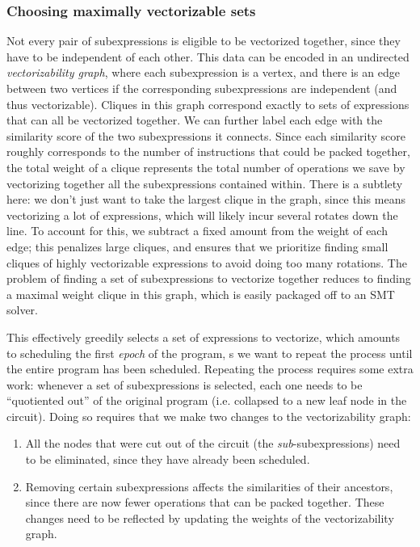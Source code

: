 \subsubsection*{Choosing maximally vectorizable sets}%
Not every pair of subexpressions is eligible to be vectorized together, since they have to be independent of each other.
This data can be encoded in an undirected {\em vectorizability graph}, where each subexpression is a vertex, and there is an edge between two vertices if the corresponding subexpressions are independent (and thus vectorizable).
Cliques in this graph correspond exactly to sets of expressions that can all be vectorized together. 
We can further label each edge with the similarity score of the two subexpressions it connects.
Since each similarity score roughly corresponds to the number of instructions that could be packed together, the total weight of a clique represents the total number of operations we save by vectorizing together all the subexpressions contained within. 
There is a subtlety here: we don't just want to take the largest clique in the graph, since this means vectorizing a lot of expressions, which will likely incur several rotates down the line. 
To account for this, we subtract a fixed amount from the weight of each edge; this penalizes large cliques, and ensures that we prioritize finding small cliques of highly vectorizable expressions to avoid doing too many rotations.
The problem of finding a set of subexpressions to vectorize together reduces to finding a maximal weight clique in this graph, which is easily packaged off to an SMT solver.

This effectively greedily selects a set of expressions to vectorize, which amounts to scheduling the first {\em epoch} of the program, s we want to repeat the process until the entire program has been scheduled.
Repeating the process requires some extra work: whenever a set of subexpressions is selected, each one needs to be ``quotiented out'' of the original program (i.e. collapsed to a new leaf node in the circuit).
Doing so requires that we make two changes to the vectorizability graph:
\begin{enumerate}
    \item All the nodes that were cut out of the circuit (the {\em sub}-subexpressions) need to be eliminated, since they have already been scheduled.
    \item Removing certain subexpressions affects the similarities of their ancestors, since there are now fewer operations that can be packed together. These changes need to be reflected by updating the weights of the vectorizability graph.
\end{enumerate}

